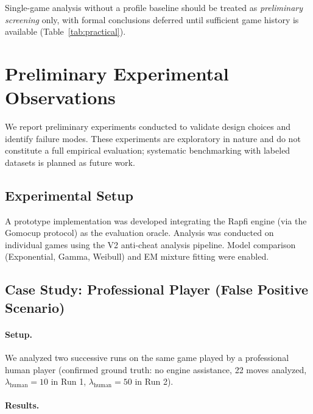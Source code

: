 \documentclass[11pt,a4paper]{article}
\begin{document}
Single-game analysis without a profile baseline should be treated as
\emph{preliminary screening} only, with formal conclusions deferred until
sufficient game history is available (Table~\ref{tab:practical}).


\section{Preliminary Experimental Observations}
\label{sec:experiments}

We report preliminary experiments conducted to validate design choices and
identify failure modes. These experiments are exploratory in nature and do not
constitute a full empirical evaluation; systematic benchmarking with labeled
datasets is planned as future work.

\subsection{Experimental Setup}

A prototype implementation was developed integrating the Rapfi engine
(via the Gomocup protocol) as the evaluation oracle. Analysis was conducted
on individual games using the V2 anti-cheat analysis pipeline. Model comparison
(Exponential, Gamma, Weibull) and EM mixture fitting were enabled.

\subsection{Case Study: Professional Player (False Positive Scenario)}

\paragraph{Setup.} We analyzed two successive runs on the same game played by
a professional human player (confirmed ground truth: no engine assistance,
22 moves analyzed, $\lambda_{\text{human}} = 10$ in Run 1, $\lambda_{\text{human}}
= 50$ in Run 2).

\paragraph{Results.}
\end{document}
